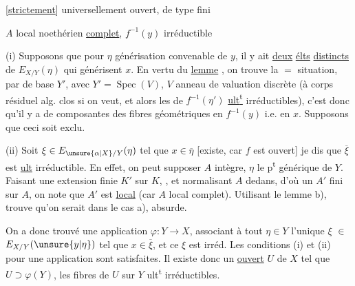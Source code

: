 [\uline{strictement}] universellement ouvert, de type fini

$A$ local noethérien \uline{complet}, $f^{-1}(y)$  irréductible

(i) Supposons que  pour $\eta$ générisation convenable de $y$, il y ait \uline{deux} \uline{élts} \uline{distincts} de $E_{X/Y}(\eta)$ qui générisent $x$. En vertu du \uline{lemme} , on trouve la $=$ situation,  par  de base $Y'$,
avec  $Y'=\operatorname{Spec}(V)$, $V$ anneau de valuation discrète (à corps résiduel alg. clos si on veut, et alors les   de $f^{-1}(\eta')$ \uline{ult\textsuperscript{t}} irréductibles), c'est donc qu'il y a  de composantes des fibres géométriques en $f^{-1}(y)$ i.e. en $x$. Supposons que ceci soit exclu.

(ii) Soit $\xi\in E_{\unsure{\alpha|X}/Y}(\eta)$ tel que $x\in\overline\eta$ [existe, car $f$ est  ouvert] je dis que $\overline\xi$ est \uline{ult} irréductible.  En effet, on peut supposer $A$ intègre, $\eta$ le p\textsuperscript{t} générique de $Y$. Faisant une extension finie  $K'$ sur $K$, , et normalisant $A$ dedans, d'où un $A'$ fini sur $A$, on note que $A'$ est \uline{local} (car $A$ local complet). Utilisant le lemme b),   trouve qu'on serait dans le cas a), absurde.

On a donc trouvé une application $\varphi:Y\to X$, associant à tout $\eta\in Y$ l'unique   $\xi$ $\in$ $E_{X/Y}(\unsure{y|\eta})$ tel que $x\in\overline\xi$, et ce $\xi$ est  irréd. Les conditions (i) et (ii) pour une application  sont satisfaites. Il existe donc un \uline{ouvert} $U$ de $X$ tel que  $U\supset\varphi(Y)$, les fibres de $U$ sur $Y$  ult\textsuperscript{t} irréductibles.
